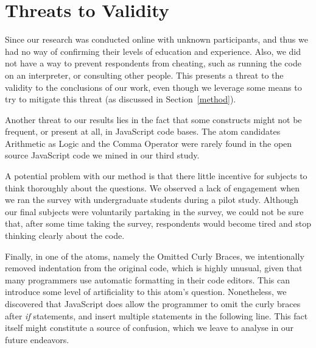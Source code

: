 \section{Threats to Validity}
\label{threat}

Since our research was conducted online with unknown participants, and thus we had no way of confirming their
levels of education and experience. Also,  we did not have a way to prevent respondents from cheating,
such as running the code on an interpreter, or consulting other people. This presents a threat to the validity to the
conclusions of our work, even though we leverage some means to try to mitigate this threat (as discussed
in Section~\ref{method}).

Another threat to our results lies in the fact that some constructs
might not be frequent, or present at all, in JavaScript code bases.
The atom candidates Arithmetic as Logic and
the Comma Operator were rarely found in the
open source JavaScript code we mined in our
third study.

A potential problem with our method is that
there little incentive for subjects to think
thoroughly about the questions. We observed a lack of
engagement when we ran the survey with undergraduate students during
a pilot study. Although our final subjects were voluntarily
partaking in the survey, we could not be sure that, after some
time taking the survey, respondents would become tired and stop thinking
clearly about the code.

Finally, in one of the atoms, namely the Omitted Curly Braces,
we intentionally removed indentation from the original code,
which is highly unusual, given that many programmers use automatic
formatting in their code editors. This can introduce some level
of artificiality to this atom's question. Nonetheless,
we discovered that JavaScript does allow the programmer
to omit the curly braces after \textit{if} statements,
and insert multiple statements in the following line.
This fact itself might constitute
a source of confusion, which we leave to analyse
in our future endeavors. 
